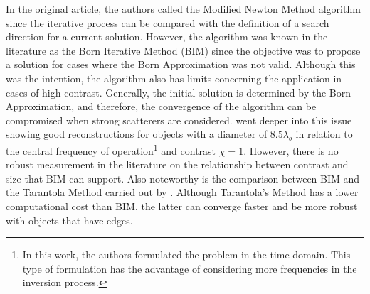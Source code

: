 			In the original article, the authors called the Modified Newton Method algorithm since the iterative process can be compared with the definition of a search direction for a current solution. However, the algorithm was known in the literature as the Born Iterative Method (BIM) since the objective was to propose a solution for cases where the Born Approximation was not valid. Although this was the intention, the algorithm also has limits concerning the application in cases of high contrast. Generally, the initial solution is determined by the Born Approximation, and therefore, the convergence of the algorithm can be compromised when strong scatterers are considered. \cite{moghaddam1993study} went deeper into this issue showing good reconstructions for objects with a diameter of $8.5\lambda_b$ in relation to the central frequency of operation\footnote{In this work, the authors formulated the problem in the time domain. This type of formulation has the advantage of considering more frequencies in the inversion process.} and contrast $\chi=1$. However, there is no robust measurement in the literature on the relationship between contrast and size that BIM can support. Also noteworthy is the comparison between BIM and the Tarantola Method carried out by \cite{moghaddam1991comparison}. Although Tarantola's Method has a lower computational cost than BIM, the latter can converge faster and be more robust with objects that have edges.
			
